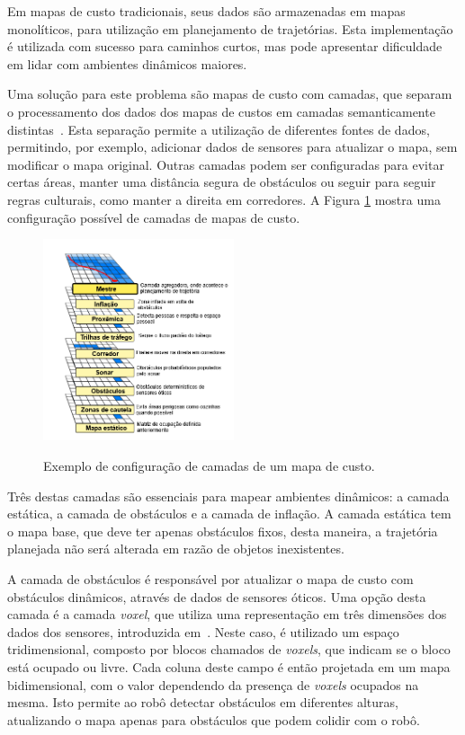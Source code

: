 \documentclass[repeatfields,xlists,xpacks,oneside,yearsonly]{ufrgscca}
\begin{document}
Em mapas de custo tradicionais, seus dados são armazenadas em mapas
monolíticos, para utilização em planejamento de trajetórias. Esta
implementação é utilizada com sucesso para caminhos curtos, mas pode
apresentar dificuldade em lidar com ambientes dinâmicos maiores.

Uma solução para este problema são mapas de custo com camadas, que
separam o processamento dos dados dos mapas de custos em camadas
semanticamente distintas~\cite{layered_costmaps}. Esta separação
permite a utilização de diferentes fontes de dados, permitindo, por
exemplo, adicionar dados de sensores para atualizar o mapa, sem
modificar o mapa original. Outras camadas podem ser configuradas para
evitar certas áreas, manter uma distância segura de obstáculos ou
seguir para seguir regras culturais, como manter a direita em
corredores. A Figura \ref{fig:mapa_camadas} mostra uma configuração
possível de camadas de mapas de custo.

\begin{figure}[h]
    {
        \centering
        \caption{Exemplo de configuração de camadas de um mapa de custo.}
        \label{fig:mapa_camadas}
        \includegraphics[width=0.5\textwidth]{mapa_camadas_trad.png}\\
    }
    {}
\end{figure}

Três destas camadas são essenciais para mapear ambientes dinâmicos: a
camada estática, a camada de obstáculos e a camada de inflação. A
camada estática tem o mapa base, que deve ter apenas obstáculos
fixos, desta maneira, a trajetória planejada não será alterada em
razão de objetos inexistentes.

A camada de obstáculos é responsável por atualizar o mapa de custo
com obstáculos dinâmicos, através de dados de sensores óticos. Uma
opção desta camada é a camada \textit{voxel}, que utiliza uma
representação em três dimensões dos dados dos sensores, introduzida
em~\textcite{office_marathon}. Neste caso, é utilizado um espaço
tridimensional, composto por blocos chamados de \textit{voxels}, que
indicam se o bloco está ocupado ou livre. Cada coluna deste campo é
então projetada em um mapa bidimensional, com o valor dependendo da
presença de \textit{voxels} ocupados na mesma. Isto permite ao robô
detectar obstáculos em diferentes alturas, atualizando o mapa apenas
para obstáculos que podem colidir com o robô.
\end{document}

